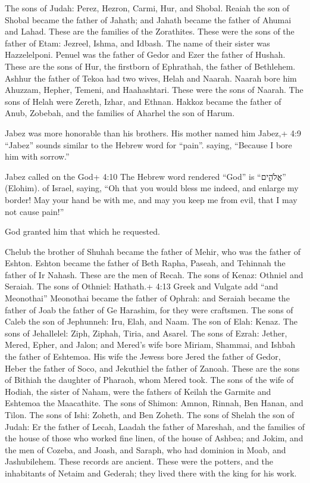  The sons of Judah: Perez, Hezron, Carmi, Hur, and Shobal.
 Reaiah the son of Shobal became the father of Jahath; and
Jahath became the father of Ahumai and Lahad. These are the families of
the Zorathites.  These were the sons of the father of Etam:
Jezreel, Ishma, and Idbash. The name of their sister was Hazzelelponi.
 Penuel was the father of Gedor and Ezer the father of
Hushah. These are the sons of Hur, the firstborn of Ephrathah, the
father of Bethlehem.  Ashhur the father of Tekoa had two
wives, Helah and Naarah.  Naarah bore him Ahuzzam, Hepher,
Temeni, and Haahashtari. These were the sons of Naarah.  The
sons of Helah were Zereth, Izhar, and Ethnan.  Hakkoz became
the father of Anub, Zobebah, and the families of Aharhel the son of
Harum.

 Jabez was more honorable than his brothers. His mother
named him Jabez,+ 4:9 ``Jabez'' sounds similar to the Hebrew word for
``pain''. saying, ``Because I bore him with sorrow.''

 Jabez called on the God+ 4:10 The Hebrew word rendered
``God'' is ``אֱלֹהִ֑ים'' (Elohim). of Israel, saying, ``Oh that you
would bless me indeed, and enlarge my border! May your hand be with me,
and may you keep me from evil, that I may not cause pain!''

God granted him that which he requested.

 Chelub the brother of Shuhah became the father of Mehir,
who was the father of Eshton.  Eshton became the father of
Beth Rapha, Paseah, and Tehinnah the father of Ir Nahash. These are the
men of Recah.  The sons of Kenaz: Othniel and Seraiah. The
sons of Othniel: Hathath.+ 4:13 Greek and Vulgate add ``and Meonothai''
 Meonothai became the father of Ophrah: and Seraiah became
the father of Joab the father of Ge Harashim, for they were craftsmen.
 The sons of Caleb the son of Jephunneh: Iru, Elah, and
Naam. The son of Elah: Kenaz.  The sons of Jehallelel:
Ziph, Ziphah, Tiria, and Asarel.  The sons of Ezrah:
Jether, Mered, Epher, and Jalon; and Mered's wife bore Miriam, Shammai,
and Ishbah the father of Eshtemoa.  His wife the Jewess
bore Jered the father of Gedor, Heber the father of Soco, and Jekuthiel
the father of Zanoah. These are the sons of Bithiah the daughter of
Pharaoh, whom Mered took.  The sons of the wife of Hodiah,
the sister of Naham, were the fathers of Keilah the Garmite and Eshtemoa
the Maacathite.  The sons of Shimon: Amnon, Rinnah, Ben
Hanan, and Tilon. The sons of Ishi: Zoheth, and Ben Zoheth.
 The sons of Shelah the son of Judah: Er the father of
Lecah, Laadah the father of Mareshah, and the families of the house of
those who worked fine linen, of the house of Ashbea;  and
Jokim, and the men of Cozeba, and Joash, and Saraph, who had dominion in
Moab, and Jashubilehem. These records are ancient.  These
were the potters, and the inhabitants of Netaim and Gederah; they lived
there with the king for his work.

